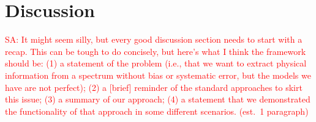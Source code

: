 \documentclass[iop,floatfix]{emulateapj}
\newcommand{\comm}[1]{ \textcolor{red}{SA: #1}}
\begin{document}
\clearpage

\section{Discussion} \label{sec:discussion}

\comm{It might seem silly, but every good discussion section needs to start with a recap.  This can 
be tough to do concisely, but here's what I think the framework should be: (1) a statement of the 
problem (i.e., that we want to extract physical information from a spectrum without bias or 
systematic error, but the models we have are not perfect); (2) a [brief] reminder of the standard 
approaches to skirt this issue; (3) a summary of our approach; (4) a statement that we demonstrated 
the functionality of that approach in some different scenarios.  (est.~1 paragraph)} \\

%
%
\end{document}
